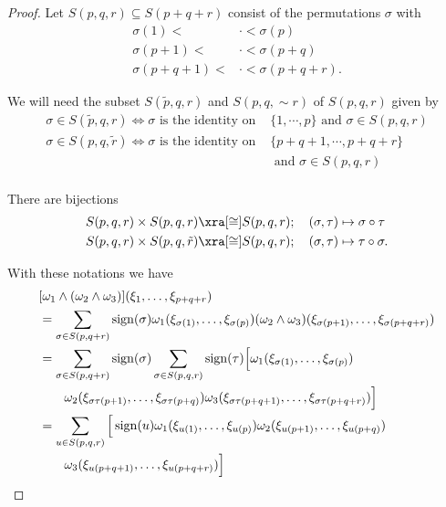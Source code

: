 \begin{proof}
  Let $S(p, q, r)\subseteq S(p+q+r)$ consist of the permutations $\sigma$ with
  \begin{align*}
    \sigma(1) <     & \cdot < \sigma(p)      \\
    \sigma(p+1) <   & \cdot < \sigma(p+q)    \\
    \sigma(p+q+1) < & \cdot < \sigma(p+q+r).
  \end{align*}

  We will need the subset $S(\tilde{p}, q, r)$ and $S(p, q, \sim{r})$ of $S(p, q, r)$ given by
  \begin{align*}
  \sigma \in S(\tilde{p}, q, r) \Longleftrightarrow \sigma \text{ is the identity on }  & \{1, \cdots, p\} \text{ and } \sigma\in S(p, q, r) \\
  \sigma \in S(p, q, \tilde{r}) \Longleftrightarrow \sigma \text{ is the identity on }  & \{p+q+1, \cdots, p+q+r\}                           \\
                                                                                        & \text{ and } \sigma\in S(p, q, r)                  \\
  \end{align*}

  There are bijections
  \begin{align}\label{eq:2-2}
    \begin{aligned}
      S(p, q, r) \times S(p, q, r)         & \xra[\cong] S(p, q, r); \quad (\sigma, \tau)\mapsto\sigma\circ\tau   \\
      S(p, q, r) \times S(p, q, \tilde{r}) & \xra[\cong] S(p, q, r); \quad (\sigma, \tau)\mapsto\tau\circ\sigma.
    \end{aligned}
  \end{align}

  With these notations we have
  \begin{align*}
    & [\omega_1\wedge(\omega_2\wedge\omega_3)](\xi_1,\ldots,\xi_{p+q+r})                                                                              \\
    & = \sum_{\sigma\in S(p,q+r)}\operatorname{sign}(\sigma)\omega_1(\xi_{\sigma(1)},\ldots,\xi_{\sigma(p)})
    (\omega_2\wedge\omega_3)(\xi_{\sigma(p+1)},\ldots,\xi_{\sigma(p+q+r)})                                                                             \\
    & = \sum_{\sigma\in S(p,q+r)}\operatorname{sign}(\sigma)\sum_{\sigma\in S(p,q,r)}\operatorname{sign}(\tau)\Big[\omega_1(\xi_{\sigma(1)},\ldots,\xi_{\sigma(p)})               \\
    & \hspace*{2em} \omega_2(\xi_{\sigma\tau(p+1)},\ldots,\xi_{\sigma\tau(p+q)})\omega_3(\xi_{\sigma\tau(p+q+1)},\ldots,\xi_{\sigma\tau(p+q+r)})\Big] \\
    & = \sum_{u\in S(p,q,r)}\Big[\operatorname{sign}(u)\omega_1(\xi_{u(1)},\ldots,\xi_{u(p)})\omega_2(\xi_{u(p+1)},\ldots,\xi_{u(p+q)})                             \\
    & \hspace*{2em} \omega_3(\xi_{u(p+q+1)},\ldots,\xi_{u(p+q+r)})\Big]
  \end{align*}


\end{proof}
